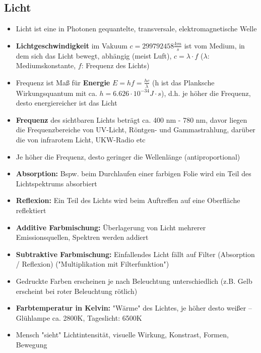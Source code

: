 \documentclass[12pt,landscape]{article}
\begin{document}
\begin{multicols}{3}
\subsection{Licht}
\begin{itemize}
\item Licht ist eine in Photonen gequantelte, 
transversale, elektromagnetische Welle
\item \textbf{Lichtgeschwindigkeit} im Vakuum $c = 299792458 \frac{km}{s}$ ist vom Medium, in dem sich das Licht bewegt, abhängig (meist Luft), $c = \lambda \cdot f$ ($\lambda$: Mediumskonstante, $f$: Frequenz des Lichts)
\item Frequenz ist Maß für \textbf{Energie} $E = hf = \frac{h c}{\lambda}$ (h ist das Planksche Wirkungsquantum mit ca. $h = 6.626 \cdot 10^{-34} J \cdot s$), d.h. je höher die Frequenz, desto energiereicher ist das Licht
\item \textbf{Frequenz} des sichtbaren Lichts beträgt ca. 400 nm - 780 nm, davor liegen die Frequenzbereiche von UV-Licht, Röntgen- und Gammastrahlung, darüber die von infrarotem Licht, UKW-Radio etc
\item Je höher die Frequenz, desto geringer die Wellenlänge (antiproportional)
\item \textbf{Absorption:} Bspw. beim Durchlaufen einer farbigen Folie wird ein Teil des Lichtspektrums absorbiert
\item \textbf{Reflexion:} Ein Teil des Lichts wird beim Auftreffen auf eine Oberfläche reflektiert
\item \textbf{Additive Farbmischung:} Überlagerung von Licht mehrerer Emissionsquellen, Spektren werden addiert
\item \textbf{Subtraktive Farbmischung:} Einfallendes Licht fällt auf Filter (Absorption / Reflexion) ("Multiplikation mit Filterfunktion")
\item Gedruckte Farben erscheinen je nach Beleuchtung unterschiedlich (z.B. Gelb erscheint bei roter Beleuchtung rötlich)
\item \textbf{Farbtemperatur in Kelvin:} "Wärme" des Lichtes, je höher desto weißer -- Glühlampe ca. 2800K, Tageslicht: 6500K
\item Mensch "sieht" Lichtintensität, visuelle Wirkung, Konstrast, Formen, Bewegung

\end{itemize}
\end{multicols}
\end{document}
